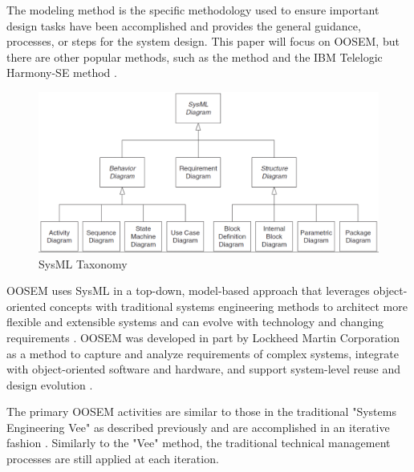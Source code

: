 The modeling method is the specific methodology used to ensure important design tasks have been accomplished and provides the general guidance, processes, or steps for the system design. This paper will focus on OOSEM, but there are other popular methods, such as the  method and the IBM Telelogic Harmony-SE method \citep{Delligatti}. 

\begin{figure}[!h]
    \centering
    \includegraphics[width=5in]{Thesis/Literature_Review/Lit Review Figures/sysML taxonomy.png}
    \caption{SysML Taxonomy}
    \label{fig:SysML Taxonomy}
\end{figure}

OOSEM uses SysML in a top-down, model-based approach that leverages object-oriented concepts with traditional systems engineering methods to architect more flexible and extensible systems and can evolve with technology and changing requirements \citep{Estefan2008}. OOSEM was developed in part by Lockheed Martin Corporation as a method to capture and analyze requirements of complex systems, integrate with object-oriented software and hardware, and support system-level reuse and design evolution \citep{INCOSEhandbook}.

The primary OOSEM activities are similar to those in the traditional "Systems Engineering Vee" as described previously and are accomplished in an iterative fashion \citep{OMGwiki}. Similarly to the "Vee" method, the traditional technical management processes are still applied at each iteration.

